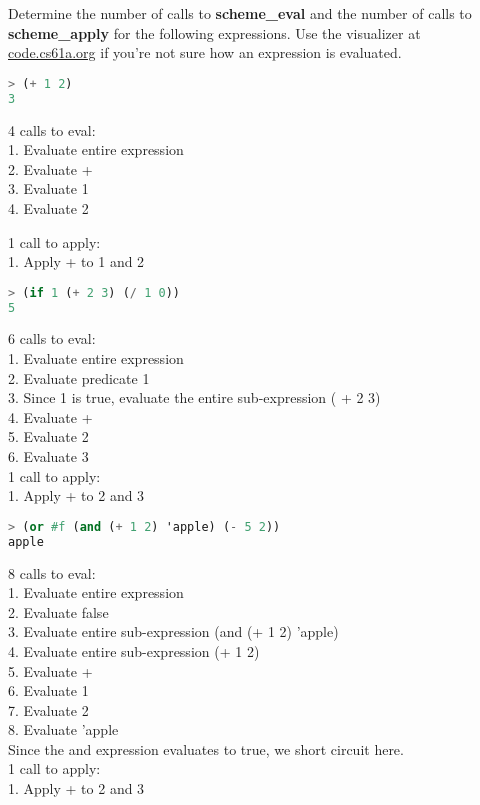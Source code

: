 \question
Determine the number of calls to \textbf{scheme\_eval} and the number of calls to \textbf{scheme\_apply} for the following expressions. Use the visualizer at \url{code.cs61a.org} if you're not sure how an expression is evaluated.

\begin{lstlisting}[language=Scheme]
> (+ 1 2)
3
\end{lstlisting}
\begin{solution}[1in]
4 calls to eval: \\
1. Evaluate entire expression \\
2. Evaluate + \\
3. Evaluate 1 \\
4. Evaluate 2

1 call to apply: \\
1. Apply + to 1 and 2 \\
\end{solution}

\begin{lstlisting}[language=Scheme]
> (if 1 (+ 2 3) (/ 1 0))
5
\end{lstlisting}
\begin{solution}[1in]
6 calls to eval: \\
1. Evaluate entire expression \\
2. Evaluate predicate 1 \\
3. Since 1 is true, evaluate the entire sub-expression ( + 2 3) \\
4. Evaluate + \\
5. Evaluate 2 \\
6. Evaluate 3 \\

1 call to apply: \\
1. Apply + to 2 and 3 \\
\end{solution}

\begin{lstlisting}[language=Scheme]
> (or #f (and (+ 1 2) 'apple) (- 5 2))
apple
\end{lstlisting}
\begin{solution}[1in]
8 calls to eval: \\
1. Evaluate entire expression \\
2. Evaluate false \\
3. Evaluate entire sub-expression (and  (+ 1 2) 'apple) \\
4. Evaluate entire sub-expression (+ 1 2) \\
5. Evaluate + \\
6. Evaluate 1 \\
7. Evaluate 2 \\
8. Evaluate 'apple \\
Since the and expression evaluates to true, we short circuit here. \\
1 call to apply: \\
1. Apply + to 2 and 3 \\
\end{solution}

